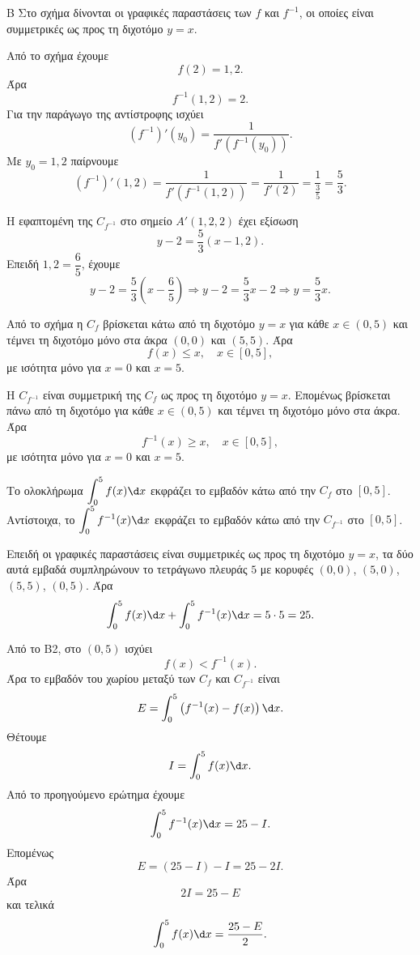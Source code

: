 
\begin{thema}{Β}
Στο σχήμα δίνονται οι γραφικές παραστάσεις των $f$ και $f^{-1}$, οι οποίες είναι συμμετρικές ως προς τη διχοτόμο $y=x$.

\begin{erwthma}
\item Από το σχήμα έχουμε
\[
f(2)=1{,}2.
\]
Άρα
\[
f^{-1}(1{,}2)=2.
\]
Για την παράγωγο της αντίστροφης ισχύει
\[
(f^{-1})'(y_0)=\frac{1}{f'(f^{-1}(y_0))}.
\]
Με $y_0=1{,}2$ παίρνουμε
\[
(f^{-1})'(1{,}2)=\frac{1}{f'(f^{-1}(1{,}2))}
=\frac{1}{f'(2)}
=\frac{1}{\frac{3}{5}}
=\frac{5}{3}.
\]

Η εφαπτομένη της $C_{f^{-1}}$ στο σημείο $A'(1{,}2,2)$ έχει εξίσωση
\[
y-2=\frac{5}{3}(x-1{,}2).
\]
Επειδή $1{,}2=\dfrac{6}{5}$, έχουμε
\[
y-2=\frac{5}{3}\left(x-\frac{6}{5}\right)
\Rightarrow y-2=\frac{5}{3}x-2
\Rightarrow y=\frac{5}{3}x.
\]

\item Από το σχήμα η $C_f$ βρίσκεται κάτω από τη διχοτόμο $y=x$ για κάθε $x\in(0,5)$ και τέμνει τη διχοτόμο μόνο στα άκρα $(0,0)$ και $(5,5)$. Άρα
\[
f(x)\leq x,\quad x\in[0,5],
\]
με ισότητα μόνο για $x=0$ και $x=5$.

Η $C_{f^{-1}}$ είναι συμμετρική της $C_f$ ως προς τη διχοτόμο $y=x$. Επομένως βρίσκεται πάνω από τη διχοτόμο για κάθε $x\in(0,5)$ και τέμνει τη διχοτόμο μόνο στα άκρα. Άρα
\[
f^{-1}(x)\geq x,\quad x\in[0,5],
\]
με ισότητα μόνο για $x=0$ και $x=5$.

\item Το ολοκλήρωμα $\dint_0^5 f(x)\d x$ εκφράζει το εμβαδόν κάτω από την $C_f$ στο $[0,5]$. Αντίστοιχα, το $\dint_0^5 f^{-1}(x)\d x$ εκφράζει το εμβαδόν κάτω από την $C_{f^{-1}}$ στο $[0,5]$.

Επειδή οι γραφικές παραστάσεις είναι συμμετρικές ως προς τη διχοτόμο $y=x$, τα δύο αυτά εμβαδά συμπληρώνουν το τετράγωνο πλευράς $5$ με κορυφές $(0,0)$, $(5,0)$, $(5,5)$, $(0,5)$. Άρα
\[
\dint_0^5 f(x)\d x+\dint_0^5 f^{-1}(x)\d x
=5\cdot 5=25.
\]

\item Από το Β2, στο $(0,5)$ ισχύει
\[
f(x)<f^{-1}(x).
\]
Άρα το εμβαδόν του χωρίου μεταξύ των $C_f$ και $C_{f^{-1}}$ είναι
\[
E=\dint_0^5\left(f^{-1}(x)-f(x)\right)\d x.
\]
Θέτουμε
\[
I=\dint_0^5 f(x)\d x.
\]
Από το προηγούμενο ερώτημα έχουμε
\[
\dint_0^5 f^{-1}(x)\d x=25-I.
\]
Επομένως
\[
E=(25-I)-I=25-2I.
\]
Άρα
\[
2I=25-E
\]
και τελικά
\[
\dint_0^5 f(x)\d x=\frac{25-E}{2}.
\]
\end{erwthma}
\end{thema}

